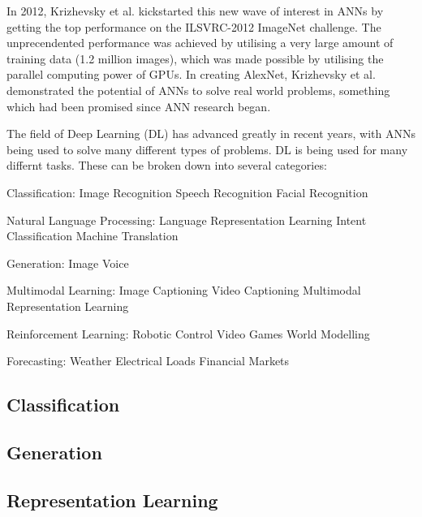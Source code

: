 In 2012, Krizhevsky et al. \cite{krizhevsky2012imagenet} kickstarted this new wave of interest in ANNs by getting the top performance on the ILSVRC-2012 ImageNet challenge. The unprecendented performance was achieved by utilising a very large amount of training data (1.2 million images), which was made possible by utilising the parallel computing power of GPUs. In creating AlexNet, Krizhevsky et al. demonstrated the potential of ANNs to solve real world problems, something which had been promised since ANN research began.

The field of Deep Learning (DL) has advanced greatly in recent years, with ANNs being used to solve many different types of problems. DL is being used for many differnt tasks. These can be broken down into several categories:


\begin{outline}
 \1 Classification:
   \2 Image Recognition \cite{krizhevsky2012imagenet, iandola2016squeezenet, he2016deep, zoph2018learning}
   \2 Speech Recognition \cite{amodei2016deep, graves2013speech}
   \2 Facial Recognition
   
 \1 Natural Language Processing:
    \2 Language Representation Learning \cite{mikolov2013distributed, mikolov2013efficient, mikolov2013linguistic}
 	\2 Intent Classification \cite{chen2016zero}
 	\2 Machine Translation \cite{cho2014learning}

 \1 Generation:
   \2 Image
   \2 Voice
   
 \1 Multimodal Learning:
 	\2 Image Captioning \cite{vinyals2015show}
 	\2 Video Captioning
 	\2 Multimodal Representation Learning \cite{ngiam2011multimodal}
   
 \1 Reinforcement Learning:
   \2 Robotic Control \cite{lillicrap2015continuous}
   \2 Video Games \cite{vinyals2019alphastar, mnih2013playing}
   \2 World Modelling \cite{azar2019world}
      
 \1 Forecasting:
   \2 Weather \cite{mahesh2018probabilistic}
   \2 Electrical Loads \cite{bouktif2018optimal}
   \2 Financial Markets \cite{fischer2018deep}
\end{outline}

\subsection{Classification}
\subsection{Generation}
\subsection{Representation Learning}
